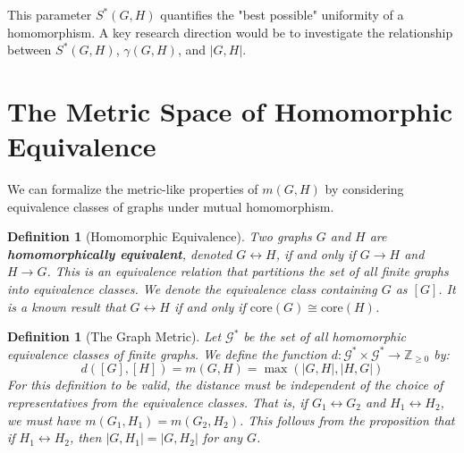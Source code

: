 \documentclass[11pt]{article}
\newtheorem{definition}[theorem]{Definition}
\begin{document}
This parameter $S^*(G,H)$ quantifies the "best possible" uniformity of a homomorphism. A key research direction would be to investigate the relationship between $S^*(G,H)$, $\gamma(G,H)$, and $|G,H|$.


\section{The Metric Space of Homomorphic Equivalence}
We can formalize the metric-like properties of $m(G,H)$ by considering equivalence classes of graphs under mutual homomorphism.

\begin{definition}[Homomorphic Equivalence]
Two graphs $G$ and $H$ are \textbf{homomorphically equivalent}, denoted $G \leftrightarrow H$, if and only if $G \rightarrow H$ and $H \rightarrow G$. This is an equivalence relation that partitions the set of all finite graphs into equivalence classes. We denote the equivalence class containing $G$ as $[G]$. It is a known result that $G \leftrightarrow H$ if and only if $\mathrm{core}(G) \cong \mathrm{core}(H)$.
\end{definition}

\begin{definition}[The Graph Metric]
Let $\mathcal{G}^*$ be the set of all homomorphic equivalence classes of finite graphs. We define the function $d: \mathcal{G}^* \times \mathcal{G}^* \to \mathbb{Z}_{\ge 0}$ by:
$$d([G], [H]) = m(G,H) = \max(|G,H|, |H,G|)$$
For this definition to be valid, the distance must be independent of the choice of representatives from the equivalence classes. That is, if $G_1 \leftrightarrow G_2$ and $H_1 \leftrightarrow H_2$, we must have $m(G_1, H_1) = m(G_2, H_2)$. This follows from the proposition that if $H_1 \leftrightarrow H_2$, then $|G, H_1| = |G, H_2|$ for any $G$.
\end{definition}
\end{document}

